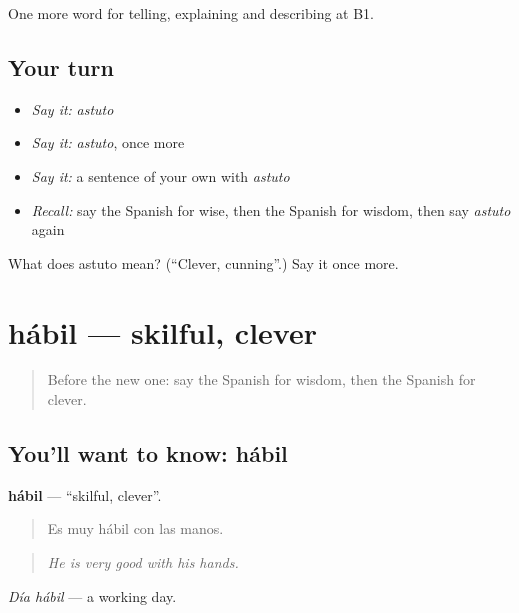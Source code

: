\begin{grammarlens}[title={What you've built}]
One more word for telling, explaining and describing at B1.
\end{grammarlens}

\subsection*{Your turn}
\begin{itemize}
\raggedright
  \item \emph{Say it:} \emph{astuto}
  \item \emph{Say it:} \emph{astuto}, once more
  \item \emph{Say it:} a sentence of your own with \emph{astuto}
  \item \emph{Recall:} say the Spanish for wise, then the Spanish for wisdom, then say \emph{astuto} again
\end{itemize}

\begin{tcolorbox}[breakable,colback=teal!4,colframe=teal!35!black,title={Before you move on}]
What does astuto mean? (\textquotedblleft{}Clever, cunning\textquotedblright{}.) Say it once more.
\end{tcolorbox}
\section[hábil]{hábil — skilful, clever}

\label{lesson:ES-C728-habil}



\begin{quote}
Before the new one: say the Spanish for wisdom, then the Spanish for clever.
\end{quote}

\subsection*{You'll want to know: hábil}
\textbf{hábil} — \textquotedblleft{}skilful, clever\textquotedblright{}.

\begin{quote}
Es muy hábil con las manos.
\end{quote}

\begin{quote}
\emph{He is very good with his hands.}
\end{quote}

\emph{Día hábil} — a working day.

